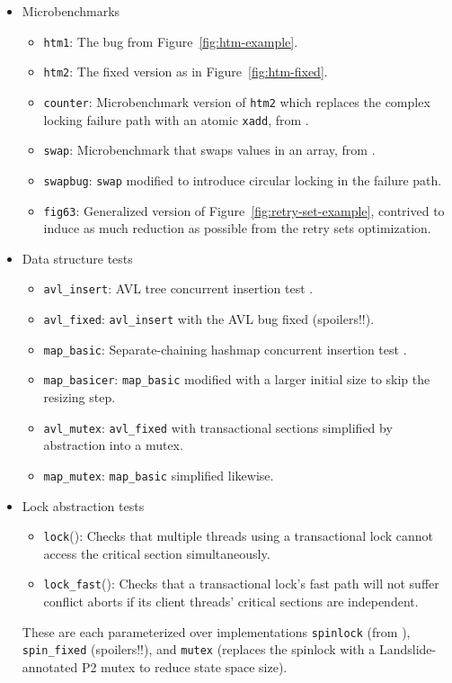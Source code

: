 \begin{itemize}
	\item Microbenchmarks
	\begin{itemize}
		\item {\tt htm1}: The bug from Figure~\ref{fig:htm-example}. %
		\item {\tt htm2}: The fixed version as in Figure~\ref{fig:htm-fixed}.
		\item {\tt counter}: Microbenchmark version of {\tt htm2} which replaces the complex locking failure path with an atomic {\tt xadd}, from \cite{tm-benchmark-cmu}.
		\item {\tt swap}: Microbenchmark that swaps values in an array, from \cite{tm-benchmark-cmu}.
		\item {\tt swapbug}: {\tt swap} modified to introduce circular locking in the failure path. %
		\item {\tt fig63}: Generalized version of Figure~\ref{fig:retry-set-example},
			contrived to induce as much reduction as possible from the retry sets optimization.
	\end{itemize}
	\item Data structure tests
	\begin{itemize}
		\item {\tt avl\_insert}: AVL tree concurrent insertion test \cite{tm-benchmark-cmu}.
		\item {\tt avl\_fixed}: {\tt avl\_insert} with the AVL bug fixed (spoilers!!).
		\item {\tt map\_basic}: Separate-chaining hashmap concurrent insertion test \cite{tm-benchmark-cmu}.
		\item {\tt map\_basicer}: {\tt map\_basic} modified with a larger initial size to skip the resizing step.
		\item {\tt avl\_mutex}: {\tt avl\_fixed} with transactional sections simplified by abstraction into a mutex.
		\item {\tt map\_mutex}: {\tt map\_basic} simplified likewise.
	\end{itemize}
	\item Lock abstraction tests
	\begin{itemize}
		\item {\tt lock}(): Checks that multiple threads using a transactional lock
			cannot access the critical section simultaneously.
		\item {\tt lock\_fast}(): Checks that a transactional lock's fast path will not suffer conflict aborts
			if its client threads' critical sections are independent.
	\end{itemize}
		These are each parameterized over implementations {\tt spinlock} (from \cite{spinlock-rtm-github}),
		{\tt spin\_\allowbreak{}fixed} (spoilers!!),
		and {\tt mutex} (replaces the spinlock with a Landslide-annotated P2 mutex to reduce state space size).
\end{itemize}

